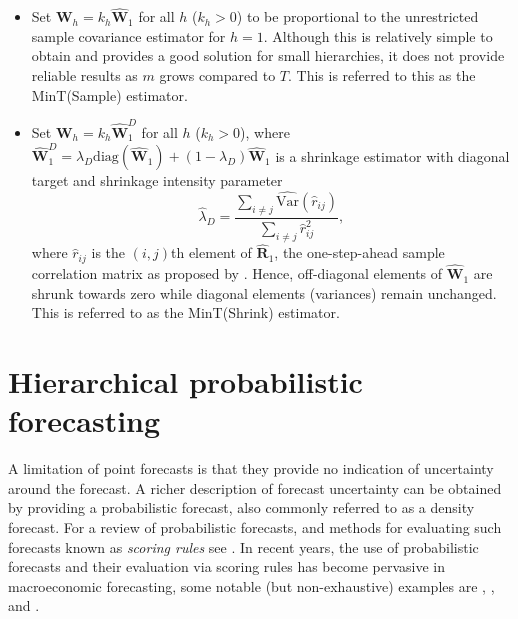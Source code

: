 \documentclass[graybox]{svmult}
\begin{document}
\begin{itemize}
	\item Set $\bm{W}_{h}=k_{h}\hat{\bm{W}}_{1}$ for all $h$ ($k_{h} > 0$) to be proportional to the unrestricted sample covariance estimator for $h=1$. Although this is relatively simple to obtain and provides a good solution for small hierarchies, it does not provide reliable results as $m$ grows compared to $T$. This is referred to this as the MinT(Sample) estimator.

	\item Set $\bm{W}_{h}=k_{h}\hat{\bm{W}}_{1}^D$ for all $h$ ($k_{h} > 0$), where $\hat{\bm{W}}^{D}_{1} = \lambda_{D} \text{diag}(\hat{\bm{W}}_{1}) + (1 - \lambda_{D})\hat{\bm{W}}_{1}$ is a shrinkage estimator with diagonal target and shrinkage intensity parameter
  $$
    \hat{\lambda}_{D} = \frac{\sum_{i \ne j}\hat{\text{Var}}(\hat{r}_{ij})}{\sum_{i \ne j}\hat{r}_{ij}^2},
  $$
	where $\hat{r}_{ij}$ is the $(i,j)$th element of $\hat{\bm{R}}_{1}$, the one-step-ahead sample correlation matrix as proposed by \citet{Schafer2005}. Hence, off-diagonal elements of $\hat{\bm{W}}_1$ are shrunk towards zero while diagonal elements (variances) remain unchanged. This is referred to as the MinT(Shrink) estimator.
\end{itemize}

\section{Hierarchical probabilistic forecasting}\label{sec:probforecasting}

A limitation of point forecasts is that they provide no indication of uncertainty around the forecast. A richer description of forecast uncertainty can be obtained by providing a probabilistic forecast, also commonly referred to as a density forecast. For a review of probabilistic forecasts, and methods for evaluating such forecasts known as \emph{scoring rules} see \citep{Gneiting2014}. In recent years, the use of probabilistic forecasts and their evaluation via scoring rules has become pervasive in macroeconomic forecasting, some notable (but non-exhaustive) examples are \citet{GewAmi2010}, \citet{BilEtAl2013}, \citet{CarEtAl2015} and \citet{ClaRav2015}.

\end{document}
